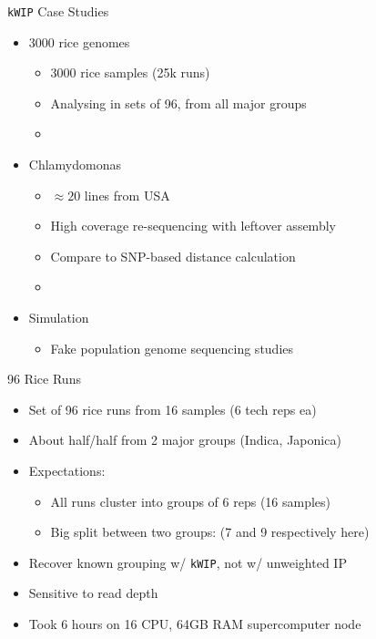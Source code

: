 \documentclass[t]{beamer}
\begin{document}
\begin{frame}{\texttt{kWIP} Case Studies}
  \begin{itemize}
    \item 3000 rice genomes
      \begin{itemize}
        \item 3000 rice samples (25k runs)
        \item Analysing in sets of 96, from all major groups
        \item \textcite{the_3000_rice_genomes_project_3000_2014}
      \end{itemize}
    \item Chlamydomonas
      \begin{itemize}
        \item $\approx 20$ lines from USA
        \item High coverage re-sequencing with leftover assembly
        \item Compare to SNP-based distance calculation
        \item \textcite{flowers_whole-genome_2015}
      \end{itemize}
    \item Simulation
      \begin{itemize}
        \item Fake population genome sequencing studies
      \end{itemize}
  \end{itemize}
\end{frame}

\begin{frame}{96 Rice Runs}
  \begin{itemize}
    \item Set of 96 rice runs from 16 samples (6 tech reps ea)
    \item About half/half from 2 major groups (Indica, Japonica)
    \item Expectations:
      \begin{itemize}
        \item All runs cluster into groups of 6 reps (16 samples)
        \item Big split between two groups: (7 and 9 respectively here)
      \end{itemize}
    \item Recover known grouping w/ \texttt{kWIP}, not w/ unweighted IP
    \item Sensitive to read depth
    \item Took 6 hours on 16 CPU, 64GB RAM supercomputer node
  \end{itemize}
\end{frame}
\end{document}
